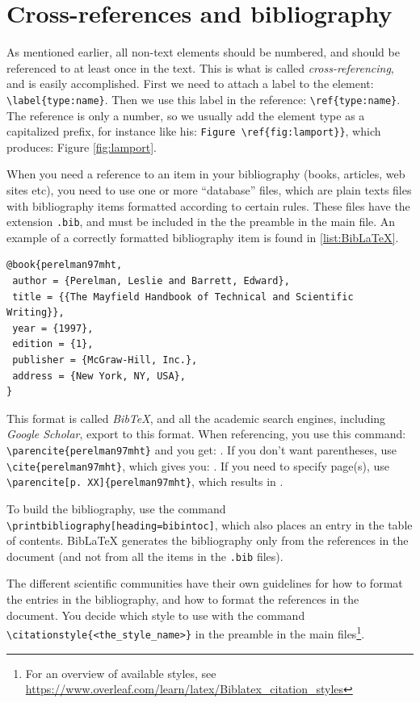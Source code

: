 \section{Cross-references and bibliography}

As mentioned earlier, all non-text elements should be numbered, and should be referenced to at least once in the text.
This is what is called {\em cross-referencing}, and is easily accomplished.
First we need to attach a label to the element: \verb|\label{type:name}|. Then we use this label in the reference: \verb|\ref{type:name}|. The reference is only a number, so we usually add the element type as a capitalized prefix, for instance like his: \verb|Figure \ref{fig:lamport}}|, which produces: Figure \ref{fig:lamport}.

When you need a reference to an item in your bibliography (books, articles, web sites etc), you need to use one or more ``database'' files, which are plain texts files with bibliography items formatted according to certain rules. These files have the extension \texttt{.bib}, and must be included in the the preamble in the main file.
An example of a correctly formatted bibliography item is found in \ref{list:BibLaTeX}.

\begin{lstlisting}[caption=BibLaTeX entry,label=list:BibLaTeX,language=Tex,float=!htbp]
 @book{perelman97mht,
 author = {Perelman, Leslie and Barrett, Edward},
 title = {{The Mayfield Handbook of Technical and Scientific Writing}},
 year = {1997},
 edition = {1},
 publisher = {McGraw-Hill, Inc.},
 address = {New York, NY, USA},
} 
\end{lstlisting} 

This format is called {\em BibTeX}, and all the academic search engines, including
 {\em Google Scholar}, export to this format.
When referencing, you use this command: \verb|\parencite{perelman97mht}|
and you get: \parencite{perelman97mht}. If you don't want parentheses, 
use \verb|\cite{perelman97mht}|, which gives you: \cite{perelman97mht}. 
If you need to specify page(s), use \verb|\parencite[p. XX]{perelman97mht}|, which results in \parencite[p. XX]{perelman97mht}.
 
To build the bibliography, use the command \verb|\printbibliography[heading=bibintoc]|, which also places an entry in the table of contents.
BibLaTeX generates the  bibliography only from the references in the document (and not from all the items in the \texttt{.bib} files).

The different scientific communities have their own guidelines for how to format the entries in the bibliography, and how to format the references in the document.
You decide which style to use with the command \verb|\citationstyle{<the_style_name>}| in the preamble in the main files\footnote{For an overview of available styles, see \url{https://www.overleaf.com/learn/latex/Biblatex_citation_styles}}.

